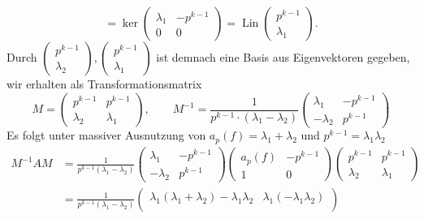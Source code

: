 \documentclass{article}
\begin{document}
\begin{enumerate}[(a)]
\[        = \ker \begin{pmatrix}
            \lambda_1 & - p^{k-1}\\
            0 & 0
        \end{pmatrix} = \operatorname{Lin} \begin{pmatrix}
            p^{k-1}\\ \lambda_1
        \end{pmatrix}.
    \]
    Durch $\begin{pmatrix}
        p^{k-1}\\
        \lambda_2
    \end{pmatrix}, \begin{pmatrix}
        p^{k-1}\\ \lambda_1
    \end{pmatrix}$ ist demnach eine Basis aus Eigenvektoren gegeben,
    wir erhalten als Transformationsmatrix
    \[
        M =   \begin{pmatrix}
            p^{k-1} & p^{k-1}\\
            \lambda_2 & \lambda_1
        \end{pmatrix},\qquad M^{-1} = \frac{1}{p^{k-1}\cdot (\lambda_1 - \lambda_2)} \begin{pmatrix}
            \lambda_1 & -p^{k-1}\\
            - \lambda_2 & p^{k-1}
        \end{pmatrix}
    \]
    Es folgt unter massiver Ausnutzung von $a_p(f) = \lambda_1 + \lambda_2$ und $p^{k-1} = \lambda_1\lambda_2$
    \begin{align*}
        M^{-1} A M &= \frac{1}{p^{k-1}(\lambda_1 - \lambda_2)}\begin{pmatrix}
            \lambda_1 & -p^{k-1}\\
            - \lambda_2 & p^{k-1}
        \end{pmatrix} \begin{pmatrix}
            a_p(f) & -p^{k-1}\\
            1 & 0 
        \end{pmatrix} \begin{pmatrix}
            p^{k-1} & p^{k-1}\\
            \lambda_2 & \lambda_1
        \end{pmatrix}\\
        &= \frac{1}{p^{k-1}(\lambda_1 - \lambda_2)}\begin{pmatrix}
            \lambda_1 (\lambda_1 + \lambda_2) - \lambda_1\lambda_2 & \lambda_1 (-\lambda_1 \lambda_2)\\

\end{pmatrix}
\end{align*}
\end{enumerate}
\end{document}
